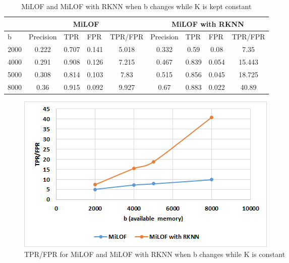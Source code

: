 \begin{table}[H]
	\centering
	\caption{MiLOF and MiLOF with RKNN when b changes while K is kept constant}
	\label{my-label}
	\begin{tabular}{|l|c|c|c|c|c|c|c|c|}
		\hline
		& \multicolumn{4}{c|}{MiLOF}                                                                                                    & \multicolumn{4}{c|}{MiLOF with RKNN}                                                                                          \\ \hline
		b                          & \multicolumn{1}{l|}{Precision} & \multicolumn{1}{l|}{TPR} & \multicolumn{1}{l|}{FPR} & \multicolumn{1}{l|}{TPR/FPR} & \multicolumn{1}{l|}{Precision} & \multicolumn{1}{l|}{TPR} & \multicolumn{1}{l|}{FPR} & \multicolumn{1}{l|}{TPR/FPR} \\ \hline
		2000                       & 0.222                          & 0.707                              & 0.141                    & 5.018                        & 0.332                          & 0.59                               & 0.08                     & 7.35                         \\ \hline
		\multicolumn{1}{|c|}{4000} & 0.291                          & 0.908                              & 0.126                    & 7.215                        & 0.467                          & 0.839                              & 0.054                    & 15.443                       \\ \hline
		\multicolumn{1}{|c|}{5000} & 0.308                          & 0.814                              & 0.103                    & 7.83                         & 0.515                          & 0.856                              & 0.045                    & 18.725                       \\ \hline
		\multicolumn{1}{|c|}{8000} & 0.36                           & 0.915                              & 0.092                    & 9.927                        & 0.67                           & 0.883                              & 0.022                    & 40.89                        \\ \hline
	\end{tabular}
\end{table}


\begin{figure}[H]
	\centering
	\includegraphics{chap04/varyb.png}
	\caption{TPR/FPR for MiLOF and MiLOF with RKNN when b changes while K is constant}
\end{figure}

